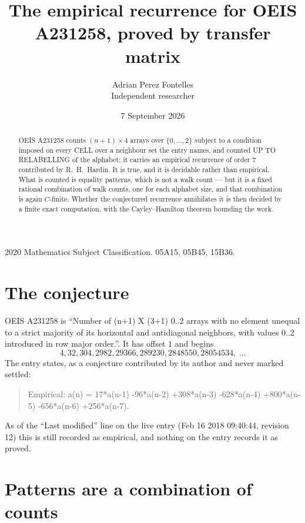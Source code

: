 \documentclass[11pt,a4paper]{article}
\title{The empirical recurrence for OEIS A231258, proved by transfer matrix}
\author{Adrian Perez Fontelles\\ \small Independent researcher}
\date{7 September 2026}
\theoremstyle{plain}
\theoremstyle{definition}
\begin{document}
\maketitle

\begin{abstract}
OEIS A231258 counts $(n+1)\times4$ arrays over $\{0,\dots,2\}$ subject to a condition imposed on
every CELL over a neighbour set the entry names, and counted UP TO RELABELLING of the
alphabet; it carries an empirical recurrence of order $7$ contributed by
R.~H.~Hardin. It is true, and it is decidable rather than empirical. What is counted is
equality patterns, which is not a walk count --- but it is a fixed rational combination of
walk counts, one for each alphabet size, and that combination is again $C$-finite. Whether the
conjectured recurrence annihilates it is then decided by a finite exact computation, with the
Cayley--Hamilton theorem bounding the work.
\end{abstract}

\noindent\small 2020 Mathematics Subject Classification. 05A15, 05B45, 15B36.\normalsize

\section{The conjecture}

OEIS A231258 is ``Number of (n+1) X (3+1) 0..2 arrays with no element unequal to a strict majority of its horizontal and antidiagonal neighbors, with values 0..2 introduced in row major order.''. It has offset $1$ and begins
\[
4, 32, 304, 2982, 29366, 289230, 2848550, 28054534,\ \dots
\]
The entry states, as a conjecture contributed by its author and never marked settled:
\begin{quote}
Empirical: a(n) = 17*a(n-1) -96*a(n-2) +308*a(n-3) -628*a(n-4) +800*a(n-5) -656*a(n-6) +256*a(n-7).
\end{quote}
As of the ``Last modified'' line on the live entry (Feb 16 2018 09:40:44, revision 12) this is still
recorded as empirical, and nothing on the entry records it as proved.

\section{Patterns are a combination of counts}
\end{document}
